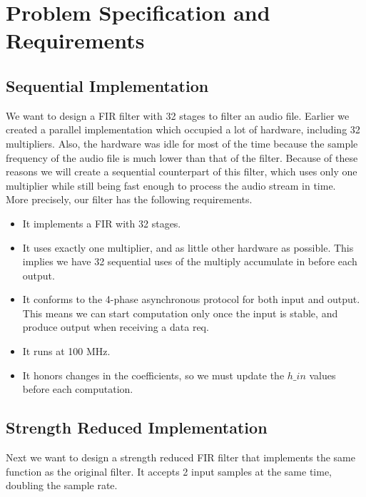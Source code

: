 \section{Problem Specification and Requirements}
\subsection{Sequential Implementation}
We want to design a FIR filter with 32 stages to filter an audio file. Earlier we created a parallel implementation which occupied a lot of hardware, including 32 multipliers. Also, the hardware was idle for most of the time because the sample frequency of the audio file is much lower than that of the filter. Because of these reasons we will create a sequential counterpart of this filter, which uses only one multiplier while still being fast enough to process the audio stream in time. \\
More precisely, our filter has the following requirements.
\begin{itemize}
\item It implements a FIR with 32 stages.
\item It uses exactly one multiplier, and as little other hardware as possible. This implies we have 32 sequential uses of the multiply accumulate in before each output.
\item It conforms to the 4-phase asynchronous protocol for both input and output. This means we can start computation only once the input is stable, and produce output when receiving a data req.
\item It runs at 100 MHz. 
\item It honors changes in the coefficients, so we must update the $h\_in$ values before each computation.

\end{itemize}

\subsection{Strength Reduced Implementation}
Next we want to design a strength reduced FIR filter that implements the same function as the original filter. It accepts 2 input samples at the same time, doubling the sample rate. 
